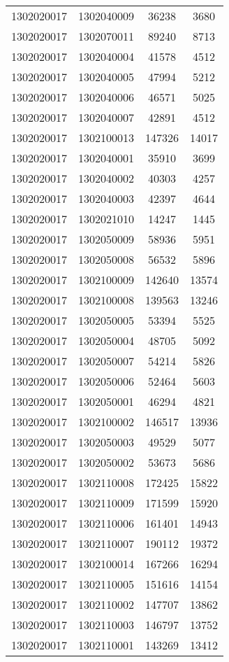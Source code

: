 \begin{longtable}{llcc}
1302020017 & 1302040009 & 36238 & 3680\\
1302020017 & 1302070011 & 89240 & 8713\\
1302020017 & 1302040004 & 41578 & 4512\\
1302020017 & 1302040005 & 47994 & 5212\\
1302020017 & 1302040006 & 46571 & 5025\\
1302020017 & 1302040007 & 42891 & 4512\\
1302020017 & 1302100013 & 147326 & 14017\\
1302020017 & 1302040001 & 35910 & 3699\\
1302020017 & 1302040002 & 40303 & 4257\\
1302020017 & 1302040003 & 42397 & 4644\\
1302020017 & 1302021010 & 14247 & 1445\\
1302020017 & 1302050009 & 58936 & 5951\\
1302020017 & 1302050008 & 56532 & 5896\\
1302020017 & 1302100009 & 142640 & 13574\\
1302020017 & 1302100008 & 139563 & 13246\\
1302020017 & 1302050005 & 53394 & 5525\\
1302020017 & 1302050004 & 48705 & 5092\\
1302020017 & 1302050007 & 54214 & 5826\\
1302020017 & 1302050006 & 52464 & 5603\\
1302020017 & 1302050001 & 46294 & 4821\\
1302020017 & 1302100002 & 146517 & 13936\\
1302020017 & 1302050003 & 49529 & 5077\\
1302020017 & 1302050002 & 53673 & 5686\\
1302020017 & 1302110008 & 172425 & 15822\\
1302020017 & 1302110009 & 171599 & 15920\\
1302020017 & 1302110006 & 161401 & 14943\\
1302020017 & 1302110007 & 190112 & 19372\\
1302020017 & 1302100014 & 167266 & 16294\\
1302020017 & 1302110005 & 151616 & 14154\\
1302020017 & 1302110002 & 147707 & 13862\\
1302020017 & 1302110003 & 146797 & 13752\\
1302020017 & 1302110001 & 143269 & 13412\\

\end{longtable}
